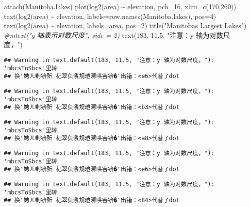 \documentclass[
]{article}
\newenvironment{Shaded}{\begin{snugshade}}{\end{snugshade}}
\newcommand{\AttributeTok}[1]{\textcolor[rgb]{0.77,0.63,0.00}{#1}}
\newcommand{\CommentTok}[1]{\textcolor[rgb]{0.56,0.35,0.01}{\textit{#1}}}
\newcommand{\DecValTok}[1]{\textcolor[rgb]{0.00,0.00,0.81}{#1}}
\newcommand{\FloatTok}[1]{\textcolor[rgb]{0.00,0.00,0.81}{#1}}
\newcommand{\FunctionTok}[1]{\textcolor[rgb]{0.00,0.00,0.00}{#1}}
\newcommand{\NormalTok}[1]{#1}
\newcommand{\SpecialCharTok}[1]{\textcolor[rgb]{0.00,0.00,0.00}{#1}}
\newcommand{\StringTok}[1]{\textcolor[rgb]{0.31,0.60,0.02}{#1}}
\begin{document}
\begin{Shaded}
\begin{Highlighting}[]
\FunctionTok{attach}\NormalTok{(Manitoba.lakes)}
\FunctionTok{plot}\NormalTok{(}\FunctionTok{log2}\NormalTok{(area) }\SpecialCharTok{\textasciitilde{}}\NormalTok{ elevation, }\AttributeTok{pch=}\DecValTok{16}\NormalTok{, }\AttributeTok{xlim=}\FunctionTok{c}\NormalTok{(}\DecValTok{170}\NormalTok{,}\DecValTok{260}\NormalTok{))}
\FunctionTok{text}\NormalTok{(}\FunctionTok{log2}\NormalTok{(area) }\SpecialCharTok{\textasciitilde{}}\NormalTok{ elevation, }\AttributeTok{labels=}\FunctionTok{row.names}\NormalTok{(Manitoba.lakes), }\AttributeTok{pos=}\DecValTok{4}\NormalTok{)}
\FunctionTok{text}\NormalTok{(}\FunctionTok{log2}\NormalTok{(area) }\SpecialCharTok{\textasciitilde{}}\NormalTok{ elevation, }\AttributeTok{labels=}\NormalTok{area, }\AttributeTok{pos=}\DecValTok{2}\NormalTok{)}
\FunctionTok{title}\NormalTok{(}\StringTok{"Manitoba\textquotesingle{}s Largest Lakes"}\NormalTok{)}
\CommentTok{\#mtext("y 轴表示对数尺度", side = 2)}
\FunctionTok{text}\NormalTok{(}\DecValTok{183}\NormalTok{, }\FloatTok{11.5}\NormalTok{, }\StringTok{"注意：y 轴为对数尺度，"}\NormalTok{)}
\end{Highlighting}
\end{Shaded}

\begin{verbatim}
## Warning in text.default(183, 11.5, "注意：y 轴为对数尺度，"): 'mbcsToSbcs'里转
## 换'娉ㄦ剰锛歽 杞翠负瀵规暟灏哄害锛�'出错：<e6>代替了dot
\end{verbatim}

\begin{verbatim}
## Warning in text.default(183, 11.5, "注意：y 轴为对数尺度，"): 'mbcsToSbcs'里转
## 换'娉ㄦ剰锛歽 杞翠负瀵规暟灏哄害锛�'出错：<b3>代替了dot
\end{verbatim}

\begin{verbatim}
## Warning in text.default(183, 11.5, "注意：y 轴为对数尺度，"): 'mbcsToSbcs'里转
## 换'娉ㄦ剰锛歽 杞翠负瀵规暟灏哄害锛�'出错：<a8>代替了dot
\end{verbatim}

\begin{verbatim}
## Warning in text.default(183, 11.5, "注意：y 轴为对数尺度，"): 'mbcsToSbcs'里转
## 换'娉ㄦ剰锛歽 杞翠负瀵规暟灏哄害锛�'出错：<e6>代替了dot
\end{verbatim}

\begin{verbatim}
## Warning in text.default(183, 11.5, "注意：y 轴为对数尺度，"): 'mbcsToSbcs'里转
## 换'娉ㄦ剰锛歽 杞翠负瀵规暟灏哄害锛�'出错：<84>代替了dot
\end{verbatim}
\end{document}
